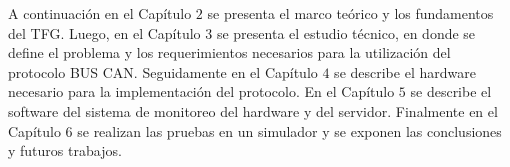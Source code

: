 A continuación en el Capítulo $2$ se presenta el marco teórico y los fundamentos del TFG. Luego, en el Capítulo $3$ se presenta el estudio técnico, en donde se define el problema y los requerimientos necesarios para la utilización del protocolo BUS CAN. 
Seguidamente en el Capítulo $4$ se describe el hardware necesario para la implementación del protocolo. 
En el Capítulo $5$  se describe el software del sistema de monitoreo del hardware y del servidor. 
Finalmente en el Capítulo $6$ se realizan las pruebas en un simulador y se exponen las conclusiones y futuros trabajos.





